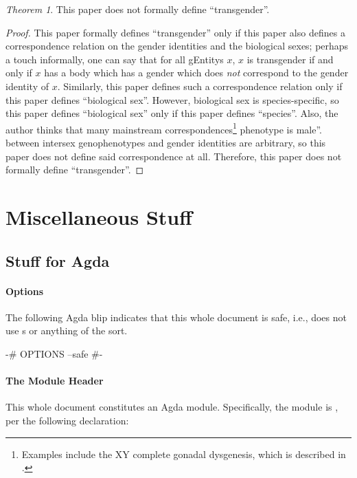 \documentclass{article}
\theoremstyle{remark}
\newtheorem{theorem}{Theorem}
\begin{document}
\begin{theorem}
  This paper does not formally define ``transgender''.
\end{theorem}
\begin{proof}
  This paper formally defines ``transgender'' only if this paper also defines a correspondence relation on the gender identities and the biological sexes; perhaps a touch informally, one can say that for all \glspl{gEntity} \(x\), \(x\) is transgender if and only if \(x\) has a body which has a gender which does \emph{not} correspond to the gender identity of \(x\).  Similarly, this paper defines such a correspondence relation only if this paper defines ``biological sex''.  However, biological sex is species-specific,\cite{citationNeeded} so this paper defines ``biological sex'' only if this paper defines ``species''.  Also, the author thinks that many mainstream correspondences\footnote{Examples include the XY complete gonadal dysgenesis, which is described in \textcite{wikipediaXyDysgenesis}.} phenotype is male''. between intersex genophenotypes and gender identities are arbitrary, so this paper does not define said correspondence at all.  Therefore, this paper does not formally define ``transgender''.
\end{proof}

\section{Miscellaneous Stuff}

\subsection{Stuff for Agda}

\paragraph{Options}
The following Agda blip indicates that this whole document is safe, i.e., does not use s or anything of the sort.

\begin{code}
{-# OPTIONS --safe #-}
\end{code}

\paragraph{The Module Header}
This whole document constitutes an Agda module.  Specifically, the module is , per the following declaration:
\end{document}
